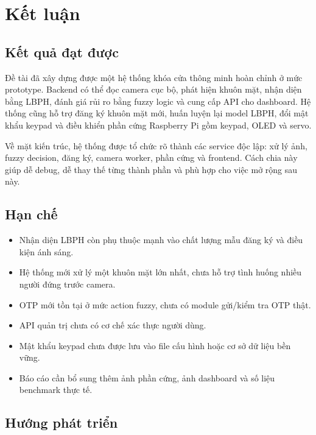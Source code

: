 \section{Kết luận}

\subsection{Kết quả đạt được}

Đề tài đã xây dựng được một hệ thống khóa cửa thông minh hoàn chỉnh ở mức prototype. Backend có thể đọc camera cục bộ, phát hiện khuôn mặt, nhận diện bằng LBPH, đánh giá rủi ro bằng fuzzy logic và cung cấp API cho dashboard. Hệ thống cũng hỗ trợ đăng ký khuôn mặt mới, huấn luyện lại model LBPH, đổi mật khẩu keypad và điều khiển phần cứng Raspberry Pi gồm keypad, OLED và servo.

Về mặt kiến trúc, hệ thống được tổ chức rõ thành các service độc lập: xử lý ảnh, fuzzy decision, đăng ký, camera worker, phần cứng và frontend. Cách chia này giúp dễ debug, dễ thay thế từng thành phần và phù hợp cho việc mở rộng sau này.

\subsection{Hạn chế}

\begin{itemize}
    \item Nhận diện LBPH còn phụ thuộc mạnh vào chất lượng mẫu đăng ký và điều kiện ánh sáng.
    \item Hệ thống mới xử lý một khuôn mặt lớn nhất, chưa hỗ trợ tình huống nhiều người đứng trước camera.
    \item OTP mới tồn tại ở mức action fuzzy, chưa có module gửi/kiểm tra OTP thật.
    \item API quản trị chưa có cơ chế xác thực người dùng.
    \item Mật khẩu keypad chưa được lưu vào file cấu hình hoặc cơ sở dữ liệu bền vững.
    \item Báo cáo cần bổ sung thêm ảnh phần cứng, ảnh dashboard và số liệu benchmark thực tế.
\end{itemize}

\subsection{Hướng phát triển}

